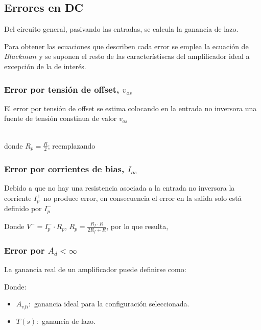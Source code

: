 \subsection{Errores en DC}
\onehalfspacing
Del circuito general, pasivando las entradas, se calcula la ganancia de lazo.
\begin{center}
\end{center}
Para obtener las ecuaciones que describen cada error se emplea la ecuación de $Blackman$ y se suponen el resto de las característiscas del amplificador ideal a excepción de la de interés.

\subsubsection{Error por tensión de offset, $v_{os}$}
\onehalfspacing
El error por tensión de offset se estima colocando en la entrada no inversora una fuente de tensión constinua de valor $v_{os}$
\begin{center}
    \\
    donde $R_p=\frac{R}{2}$; reemplazando \\
\end{center}

\subsubsection{Error por corrientes de bias, $I_{os}$}
\onehalfspacing
Debido a que no hay una resistencia asociada a la entrada no inversora la corriente $I^{+}_p$ no produce error, en consecuencia el error en la salida solo está definido por $I^{-}_p$
\begin{center}
\end{center}
Donde $V^{-}=I^{-}_p\cdot R_p$, $R_p=\frac{R_f\cdot R}{2R_f+R}$, por lo que resulta,
\begin{center}
\end{center}

\subsubsection{Error por $A_d<\infty$}
\onehalfspacing
La ganancia real de un amplificador puede definirse como:
\begin{center}
\end{center}
Donde:
\begin{itemize}
    \item $A_{vfi}:$ ganancia ideal para la configuración seleccionada.
    \item $T(s):$ ganancia de lazo.
\end{itemize}
